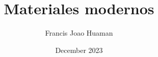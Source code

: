 \documentclass{article}
\title{Materiales modernos}
\author{Francis Joao Huaman}
\date{December 2023}
\begin{document}

\doublespacing
\tableofcontents









\end{document}
